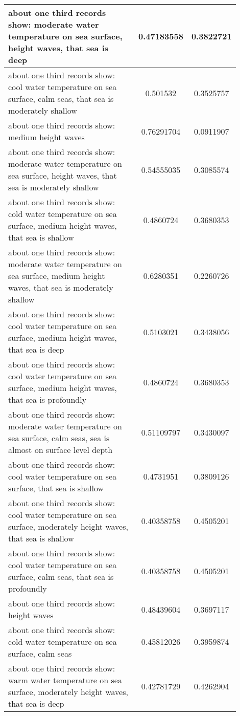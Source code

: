\documentclass{article}
\begin{document}
\begin{longtable}{|p{0.9\linewidth}|c|c|}
about one third records show: moderate water temperature on sea surface, height waves, that sea is deep & 0.47183558 & 0.3822721 \\ \hline
about one third records show: cool water temperature on sea surface, calm seas, that sea is moderately shallow & 0.501532 & 0.3525757 \\ \hline
about one third records show: medium height waves & 0.76291704 & 0.0911907 \\ \hline
about one third records show: moderate water temperature on sea surface, height waves, that sea is moderately shallow & 0.54555035 & 0.3085574 \\ \hline
about one third records show: cold water temperature on sea surface, medium height waves, that sea is shallow & 0.4860724 & 0.3680353 \\ \hline
about one third records show: moderate water temperature on sea surface, medium height waves, that sea is moderately shallow & 0.6280351 & 0.2260726 \\ \hline
about one third records show: cool water temperature on sea surface, medium height waves, that sea is deep & 0.5103021 & 0.3438056 \\ \hline
about one third records show: cool water temperature on sea surface, medium height waves, that sea is profoundly & 0.4860724 & 0.3680353 \\ \hline
about one third records show: moderate water temperature on sea surface, calm seas, sea is almost on surface level depth & 0.51109797 & 0.3430097 \\ \hline
about one third records show: cool water temperature on sea surface, that sea is shallow & 0.4731951 & 0.3809126 \\ \hline
about one third records show: cool water temperature on sea surface, moderately height waves, that sea is shallow & 0.40358758 & 0.4505201 \\ \hline
about one third records show: cool water temperature on sea surface, calm seas, that sea is profoundly & 0.40358758 & 0.4505201 \\ \hline
about one third records show: height waves & 0.48439604 & 0.3697117 \\ \hline
about one third records show: cold water temperature on sea surface, calm seas & 0.45812026 & 0.3959874 \\ \hline
about one third records show: warm water temperature on sea surface, moderately height waves, that sea is deep & 0.42781729 & 0.4262904 \\ \hline

\end{longtable}
\end{document}
